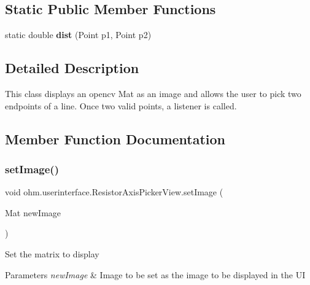 \subsection*{Static Public Member Functions}
\begin{DoxyCompactItemize}
\item 
\hypertarget{classohm_1_1userinterface_1_1_resistor_axis_picker_view_a09ec66453bd16e8f693d7bddc16aed9e}{}\label{classohm_1_1userinterface_1_1_resistor_axis_picker_view_a09ec66453bd16e8f693d7bddc16aed9e} 
static double {\bfseries dist} (Point p1, Point p2)
\end{DoxyCompactItemize}


\subsection{Detailed Description}
This class displays an opencv Mat as an image and allows the user to pick two endpoints of a line. Once two valid points, a listener is called. 

\subsection{Member Function Documentation}
\hypertarget{classohm_1_1userinterface_1_1_resistor_axis_picker_view_aca0066d9015235e9379505a8e89543b1}{}\label{classohm_1_1userinterface_1_1_resistor_axis_picker_view_aca0066d9015235e9379505a8e89543b1} 
\subsubsection{\texorpdfstring{set\+Image()}{setImage()}}
{\footnotesize\ttfamily void ohm.\+userinterface.\+Resistor\+Axis\+Picker\+View.\+set\+Image (\begin{DoxyParamCaption}\item[{Mat}]{new\+Image }\end{DoxyParamCaption})}

Set the matrix to display 
\begin{DoxyParams}{Parameters}
{\em new\+Image} & Image to be set as the image to be displayed in the UI \\
\hline
\end{DoxyParams}
\hypertarget{classohm_1_1userinterface_1_1_resistor_axis_picker_view_a78a2696e3a51570963bbf23870bee204}{}\label{classohm_1_1userinterface_1_1_resistor_axis_picker_view_a78a2696e3a51570963bbf23870bee204} 
